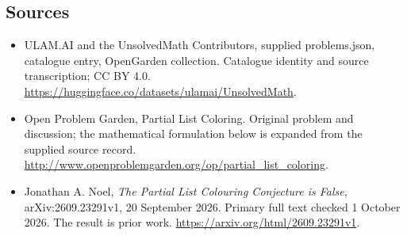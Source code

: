 \documentclass[11pt,a4paper]{article}
\begin{document}
\subsection{Sources}
\begin{itemize}
\item[S1] ULAM.AI and the UnsolvedMath Contributors, supplied problems.json, catalogue entry, OpenGarden collection. Catalogue identity and source transcription; CC BY 4.0.
\url{https://huggingface.co/datasets/ulamai/UnsolvedMath}.
\item[S2] Open Problem Garden, Partial List Coloring. Original problem and discussion; the mathematical formulation below is expanded from the supplied source record.
\url{http://www.openproblemgarden.org/op/partial_list_coloring}.
\item[R1] Jonathan A. Noel, \emph{The Partial List Colouring
Conjecture is False}, arXiv:2609.23291v1, 20 September 2026.
Primary full text checked 1 October 2026. The result is prior work.
\url{https://arxiv.org/html/2609.23291v1}.
\end{itemize}
\end{document}
